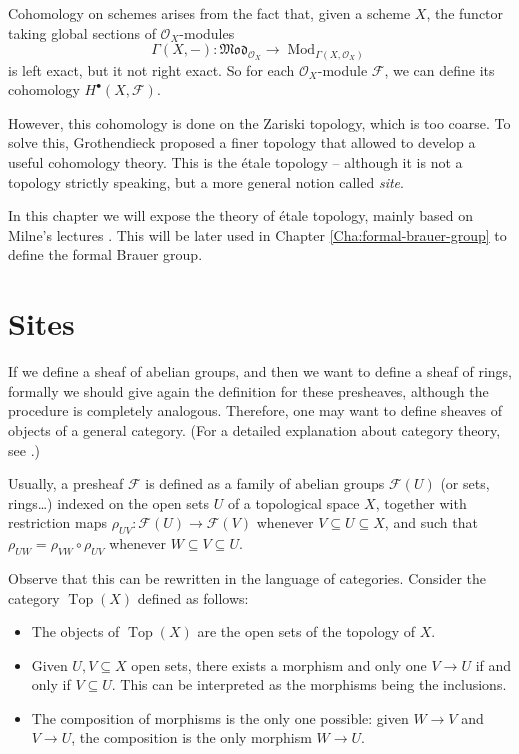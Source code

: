 \documentclass{report}
\DeclareMathOperator{\Mod}{Mod}
\DeclareMathOperator{\Top}{Top}
\theoremstyle{definition}
\begin{document}
Cohomology on schemes arises from the fact that, given a scheme $X$, the functor taking global sections of $\mathcal{O}_X$-modules
\[\Gamma(X,-):\mathfrak{Mod}_{\mathcal{O}_X}\longrightarrow\Mod_{\Gamma(X,\mathcal{O}_X)}\]
is left exact, but it not right exact. So for each $\mathcal{O}_X$-module $\mathcal{F}$, we can define its cohomology $H^{\bullet}(X,\mathcal{F})$.

However, this cohomology is done on the Zariski topology, which is too coarse. To solve this, Grothendieck proposed a finer topology that allowed to develop a useful cohomology theory. This is the \'{e}tale topology -- although it is not a topology strictly speaking, but a more general notion called \emph{site}.

In this chapter we will expose the theory of \'{e}tale topology, mainly based on Milne's lectures \cite{milne2013lectures}. This will be later used in Chapter \ref{Cha:formal-brauer-group} to define the formal Brauer group.

\section{Sites}

If we define a sheaf of abelian groups, and then we want to define a sheaf of rings, formally we should give again the definition for these presheaves, although the procedure is completely analogous. Therefore, one may want to define sheaves of objects of a general category. (For a detailed explanation about category theory, see \cite{mac2013categories}.)

Usually, a presheaf $\mathcal{F}$ is defined as a family of abelian groups $\mathcal{F}(U)$ (or sets, rings\ldots) indexed on the open sets $U$ of a topological space $X$, together with restriction maps $\rho_{UV}:\mathcal{F}(U)\rightarrow\mathcal{F}(V)$ whenever $V\subseteq U\subseteq X$, and such that $\rho_{UW}=\rho_{VW}\circ\rho_{UV}$ whenever $W\subseteq V\subseteq U$.

Observe that this can be rewritten in the language of categories. Consider the category $\Top(X)$ defined as follows:
\begin{itemize}
\item The objects of $\Top(X)$ are the open sets of the topology of $X$.

\item Given $U,V\subseteq X$ open sets, there exists a morphism and only one $V\rightarrow U$ if and only if $V\subseteq U$. This can be interpreted as the morphisms being the inclusions.

\item The composition of morphisms is the only one possible: given $W\rightarrow V$ and $V\rightarrow U$, the composition is the only morphism $W\rightarrow U$.
\end{itemize}
\end{document}
